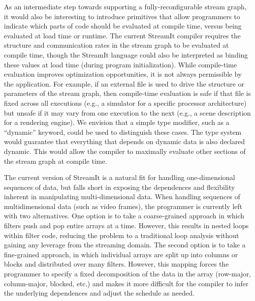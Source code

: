   As an intermediate step towards supporting a fully-reconfigurable
  stream graph, it would also be interesting to introduce primitives
  that allow programmers to indicate which parts of code should be
  evaluated at compile time, versus being evaluated at load time or
  runtime.  The current StreamIt compiler requires the structure and
  communication rates in the stream graph to be evaluated at compile
  time, though the StreamIt language could also be interpreted as
  binding these values at load time (during program initialization).
  While compile-time evaluation improves optimization opportunities,
  it is not always permissible by the application.  For example, if an
  external file is used to drive the structure or parameters of the
  stream graph, then compile-time evaluation is safe if that file is
  fixed across all executions (e.g., a simulator for a specific
  processor architecture) but unsafe if it may vary from one execution
  to the next (e.g., a scene description for a rendering engine).  We
  envision that a simple type modifier, such as a ``dynamic'' keyword,
  could be used to distinguish these cases.  The type system would
  guarantee that everything that depends on dynamic data is also
  declared dynamic.  This would allow the compiler to maximally
  evaluate other sections of the stream graph at compile time.

  The current version of StreamIt is
  a natural fit for handling one-dimensional sequences of data, but
  falls short in exposing the dependences and flexibility inherent in
  manipulating multi-dimensional data.  When handling sequences of
  multidimensional data (such as video frames), the programmer is
  currently left with two alternatives.  One option is to take a
  coarse-grained approach in which filters push and pop entire arrays
  at a time.  However, this results in nested loops within filter
  code, reducing the problem to a traditional loop analysis without
  gaining any leverage from the streaming domain.  The second option
  is to take a fine-grained approach, in which individual arrays are
  split up into columns or blocks and distributed over many filters.
  However, this mapping forces the programmer to specify a fixed
  decomposition of the data in the array (row-major, column-major,
  blocked, etc.) and makes it more difficult for the compiler to infer
  the underlying dependences and adjust the schedule as needed.

